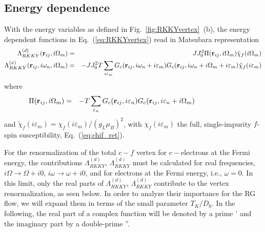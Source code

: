\documentclass[12pt,twoside]{article}
\newcommand{\Eq}[1]{Eq.~(\ref{#1})}
\begin{document}
\subsection{Energy dependence}
\label{subsec:RKKYvertex-energy}


With the energy variables as defined in Fig.~\ref{fig:RKKYvertex}~(b),
the energy dependent functions in \Eq{eq:RKKYvertex} read 
in Matsubara representation 
\begin{eqnarray}
\Lambda^{(d)}_{RKKY}({\bf r}_{ij},i\Omega_m) &=& 
JJ_0^2\Pi({\bf r}_{ij},i\Omega_m)\tilde\chi_f(i\Omega_m) 
\nonumber
\label{eq:Lambda_d0}\\ 
\Lambda^{(x)}_{RKKY}({\bf r}_{ij},i\omega_n,i\Omega_m) &=& 
-JJ_0^2 T\sum_{i\varepsilon_m} 
G_c({\bf r}_{ij},i\omega_n+i\varepsilon_m)
G_c({\bf r}_{ij},i\omega_n+i\Omega_m+i\varepsilon_m)\tilde\chi_f(i\varepsilon_m)
\nonumber
\label{eq:Lambda_x0}
\end{eqnarray}
where
\begin{eqnarray}
\Pi({\bf r}_{ij},i\Omega_m) &=& - T\sum_{\varepsilon_n}
G_c({\bf r}_{ij},i\varepsilon_n)G_c({\bf r}_{ij},i\varepsilon_n+i\Omega_m) \hspace*{2.1cm}
\label{eq:chic}
\end{eqnarray}
and $\tilde\chi_f(i\varepsilon_m)=\chi_f(i\varepsilon_m)/(g_L\mu_B)^2$, 
with $\chi_f(i\varepsilon_m)$ the full, single-impurity $f$-spin 
susceptibility, \Eq{eq:chif_ret}.  

 
For the renormalization of the total $c-f$ vertex for $c-$electrons 
at the Fermi energy, 
the contributions $\Lambda^{(d)}_{RKKY}$, $\Lambda^{(d)}_{RKKY}$
must be calculated for real frequencies, $i\Omega\to \Omega+i0$,
$i\omega\to \omega+i0$, and for electrons at the Fermi energy, i.e.,
$\omega=0$. In this limit, only the real parts of 
$\Lambda^{(d)}_{RKKY}$, $\Lambda^{(d)}_{RKKY}$ contribute to the vertex 
renormalization, as seen below.
In order to analyze their importance for the RG flow, we will
expand them in terms of the small parameter $T_K/D_0$.
In the following, the real part of a complex function will be denoted 
by a prime {'} and the imaginary part by a double-prime {''}.\\[0.2cm]
 
\end{document}
